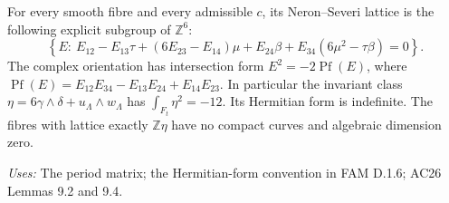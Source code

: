 \begin{proposition}[FAM D.1.4; T]\label{fam:D.1.4}
For every smooth fibre and every admissible \(c\), its Neron--Severi lattice
is the following explicit subgroup of \(\mathbb Z^6\):
\begin{equation}\label{fam:eq:cd-NS}
 \left\{E:\ E_{12}-E_{13}\tau+(6E_{23}-E_{14})\mu+
 E_{24}\beta+E_{34}(6\mu^2-\tau\beta)=0\right\}.
\end{equation}
The complex orientation has intersection form
\(E^2=-2\operatorname{Pf}(E)\), where
\(\operatorname{Pf}(E)=E_{12}E_{34}-E_{13}E_{24}+E_{14}E_{23}\).
In particular the invariant class \(\eta=6\gamma\wedge\delta+u_{\Lambda}\wedge w_{\Lambda}\)
has \(\int_{F_t}\eta^2=-12\). Its Hermitian form is indefinite.
The fibres with lattice exactly \(\mathbb Z\eta\) have no compact curves
and algebraic dimension zero.
\end{proposition}
\noindent\emph{Uses:} The period matrix; the Hermitian-form convention in FAM D.1.6; AC26 Lemmas 9.2 and 9.4.\par

